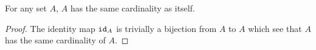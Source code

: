 \guard



\begin{prop}
\label{prop:cardinalityIsReflexive}
  For any set $A$, $A$ has the same cardinality as itself.
\end{prop}
\begin{proof}
  The identity map $\texttt{id}_A$ is trivially a bijection from $A$ to $A$ which see that $A$ has the same cardinality of $A$.
\end{proof}
